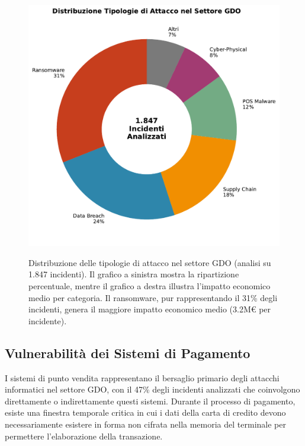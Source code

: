 \begin{figure}[htbp]
\centering
\includegraphics[width=\textwidth]{thesis_figures/cap2/fig_2_2_attack_types.pdf}
\caption{Distribuzione delle tipologie di attacco nel settore GDO (analisi su 1.847 incidenti). Il grafico a sinistra mostra la ripartizione percentuale, mentre il grafico a destra illustra l'impatto economico medio per categoria. Il ransomware, pur rappresentando il 31\% degli incidenti, genera il maggiore impatto economico medio (3.2M€ per incidente).}\autocite{CPR2025}
\label{fig:attack_types}
\end{figure}

\subsection{\texorpdfstring{\textbf{Vulnerabilità dei Sistemi di Pagamento}}{2.3.1 - Vulnerabilità dei Sistemi di Pagamento}}

I sistemi di punto vendita rappresentano il bersaglio primario degli attacchi informatici nel settore GDO, con il 47\% degli incidenti analizzati che coinvolgono direttamente o indirettamente questi sistemi. Durante il processo di pagamento, esiste una finestra temporale critica in cui i dati della carta di credito devono necessariamente esistere in forma non cifrata nella memoria del terminale per permettere l'elaborazione della transazione.


